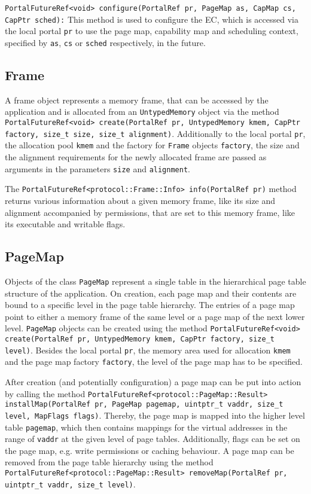   \texttt{PortalFutureRef<void> configure(PortalRef pr, PageMap as, CapMap cs,
  CapPtr sched):} This method is used to configure the EC, which is accessed via
  the local portal \texttt{pr} to use the page map, capability map and
  scheduling context, specified by \texttt{as}, \texttt{cs} or \texttt{sched}
  respectively, in the future.

\subsection{Frame}
A frame object represents a memory frame, that can be accessed by the
application and is allocated from an \texttt{UntypedMemory} object via the
method \texttt{PortalFutureRef<void> create(PortalRef pr, UntypedMemory kmem,
CapPtr factory, size\_t size, size\_t alignment)}. Additionally to the local
portal \texttt{pr}, the allocation pool \texttt{kmem} and the factory for
\texttt{Frame} objects \texttt{factory}, the size and the alignment requirements
for the newly allocated frame are passed as arguments in the parameters
\texttt{size} and \texttt{alignment}.

The \texttt{PortalFutureRef<protocol::Frame::Info> info(PortalRef pr)} method
returns various information about a given memory frame, like its size and
alignment accompanied by permissions, that are set to this memory frame, like
its executable and writable flags.

\subsection{PageMap}
Objects of the class \texttt{PageMap} represent a single table in the
hierarchical page table structure of the application. On creation, each page map
and their contents are bound to a specific level in the page table hierarchy.
The entries of a page map point to either a memory frame of the same level or a
page map of the next lower level.
\texttt{PageMap} objects can be created using the method
\texttt{PortalFutureRef<void> create(PortalRef pr, UntypedMemory kmem, CapPtr
factory, size\_t level)}. Besides the local portal \texttt{pr}, the memory area
used for allocation \texttt{kmem} and the page map factory \texttt{factory}, the
level of the page map has to be specified.

After creation (and potentially configuration) a page map can be put into action
by calling the method \texttt{PortalFutureRef<protocol::PageMap::Result>
installMap(PortalRef pr, PageMap pagemap, uintptr\_t vaddr, size\_t level,
MapFlags flags)}. Thereby, the page map is mapped into the higher level table
\texttt{pagemap}, which then contains mappings for the virtual addresses in the
range of \texttt{vaddr} at the given level of page tables. Additionally, flags
can be set on the page map, e.g. write permissions or caching behaviour. A page
map can be removed from the page table hierarchy using the method
\texttt{PortalFutureRef<protocol::PageMap::Result> removeMap(PortalRef pr, \\
uintptr\_t vaddr, size\_t level)}.

